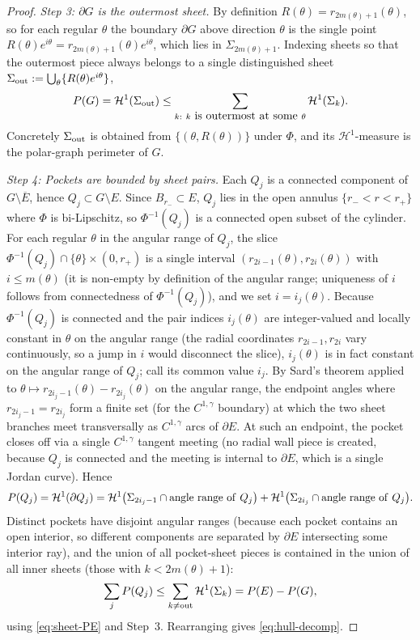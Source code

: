 \documentclass[11pt]{amsart}
\newcommand{\HH}{\mathcal H}
\begin{document}
\begin{proof}
\emph{Step 3: \(\partial G\) is the outermost sheet.}  By definition
\(R(\theta)=r_{2m(\theta)+1}(\theta)\), so for each regular \(\theta\)
the boundary \(\partial G\) above direction \(\theta\) is the single
point \(R(\theta)e^{i\theta}=r_{2m(\theta)+1}(\theta)e^{i\theta}\),
which lies in \(\Sigma_{2m(\theta)+1}\).  Indexing sheets so that the
outermost piece always belongs to a single distinguished sheet
\(\Sigma_{\rm out}:=\bigcup_\theta\{R(\theta)e^{i\theta}\}\),
\[
   P(G)=\HH^1(\Sigma_{\rm out})
      \le\sum_{k:\ k\hbox{ is outermost at some }\theta}\HH^1(\Sigma_k).
\]
Concretely \(\Sigma_{\rm out}\) is obtained from
\(\{(\theta,R(\theta))\}\) under \(\Phi\), and its \(\HH^1\)-measure is
the polar-graph perimeter of \(G\).

\emph{Step 4: Pockets are bounded by sheet pairs.}  Each \(Q_j\) is a
connected component of \(G\setminus\overline E\), hence \(Q_j\subset
G\setminus E\).  Since \(B_{r_-}\subset E\), \(Q_j\) lies in the open
annulus \(\{r_-<r<r_+\}\) where \(\Phi\) is bi-Lipschitz, so \(\Phi
^{-1}(Q_j)\) is a connected open subset of the cylinder.  For each
regular \(\theta\) in the angular range of \(Q_j\), the slice
\(\Phi^{-1}(Q_j)\cap\{\theta\}\times(0,r_+)\) is a single interval
\((r_{2i-1}(\theta),r_{2i}(\theta))\) with \(i\le m(\theta)\) (it is
non-empty by definition of the angular range; uniqueness of \(i\)
follows from connectedness of \(\Phi^{-1}(Q_j)\)), and we set
\(i=i_j(\theta)\).  Because \(\Phi^{-1}(Q_j)\) is connected and the
pair indices \(i_j(\theta)\) are integer-valued and locally constant
in \(\theta\) on the angular range (the radial coordinates
\(r_{2i-1},r_{2i}\) vary continuously, so a jump in \(i\) would
disconnect the slice), \(i_j(\theta)\) is in fact constant on the
angular range of \(Q_j\); call its common value \(i_j\).  By Sard's
theorem applied to \(\theta\mapsto r_{2i_j-1}(\theta)-r_{2i_j}(\theta)\)
on the angular range, the endpoint angles where
\(r_{2i_j-1}=r_{2i_j}\) form a finite set (for the \(C^{1,\gamma}\)
boundary) at which the two sheet branches meet transversally as
\(C^{1,\gamma}\) arcs of \(\partial E\).  At such an endpoint, the pocket
closes off via a single \(C^{1,\gamma}\) tangent meeting (no radial wall
piece is created, because \(Q_j\) is connected and the meeting is
internal to \(\partial E\), which is a single Jordan curve).  Hence
\[
   P(Q_j)=\HH^1(\partial Q_j)
      =\HH^1\bigl(\Sigma_{2i_j-1}\cap{\rm angle\ range\ of\ }Q_j\bigr)
      +\HH^1\bigl(\Sigma_{2i_j}\cap{\rm angle\ range\ of\ }Q_j\bigr).
\]
Distinct pockets have disjoint angular ranges (because each pocket
contains an open interior, so different components are separated by
\(\partial E\) intersecting some interior ray), and the union of all
pocket-sheet pieces is contained in the union of all inner sheets
(those with \(k<2m(\theta)+1\)):
\[
   \sum_j P(Q_j)\le \sum_{k\ne {\rm out}}\HH^1(\Sigma_k)
      =P(E)-P(G),
\]
using \eqref{eq:sheet-PE} and Step~3.  Rearranging gives
\eqref{eq:hull-decomp}.
\end{proof}
\end{document}
